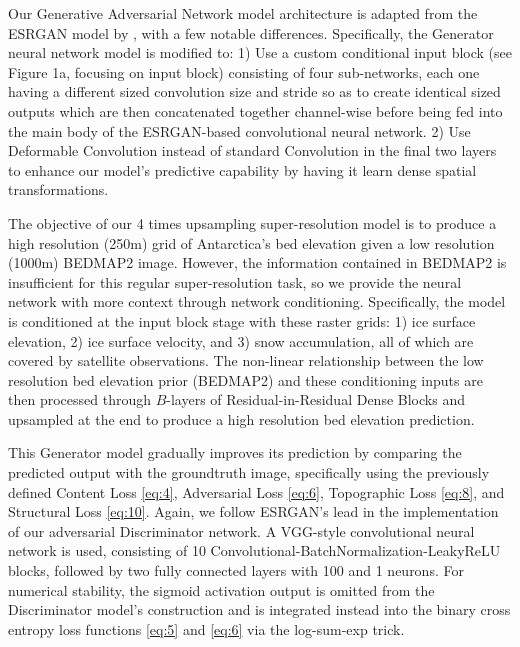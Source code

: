 \documentclass[tc, manuscript]{copernicus}
\begin{document}
Our Generative Adversarial Network model architecture is adapted from the ESRGAN model by \citet{WangESRGANEnhancedSuperResolution2018}, with a few notable differences.
Specifically, the Generator neural network model is modified to:
1) Use a custom conditional input block (see Figure 1a, focusing on input block) consisting of four sub-networks, each one having a different sized convolution size and stride so as to create identical sized outputs which are then concatenated together channel-wise before being fed into the main body of the ESRGAN-based convolutional neural network.
2) Use Deformable Convolution \citep{DaiDeformableConvolutionalNetworks2017} instead of standard Convolution in the final two layers to enhance our model's predictive capability by having it learn dense spatial transformations.

The objective of our 4 times upsampling super-resolution model is to produce a high resolution (250m) grid of Antarctica's bed elevation given a low resolution (1000m) BEDMAP2 \citep{FretwellBedmap2improvedice2013} image.
However, the information contained in BEDMAP2 is insufficient for this regular super-resolution task, so we provide the neural network with more context through network conditioning.
Specifically, the model is conditioned at the input block stage with these raster grids: 1) ice surface elevation, 2) ice surface velocity, and 3) snow accumulation, all of which are covered by satellite observations.
The non-linear relationship between the low resolution bed elevation prior (BEDMAP2) and these conditioning inputs are then processed through $B$-layers of Residual-in-Residual Dense Blocks and upsampled at the end to produce a high resolution bed elevation prediction.

This Generator model gradually improves its prediction by comparing the predicted output with the groundtruth image, specifically using the previously defined Content Loss \eqref{eq:4}, Adversarial Loss \eqref{eq:6}, Topographic Loss \eqref{eq:8}, and Structural Loss \eqref{eq:10}.
Again, we follow ESRGAN's lead in the implementation of our adversarial Discriminator network.
A VGG-style convolutional neural network \citep{SimonyanVeryDeepConvolutional2014} is used, consisting of 10 Convolutional-BatchNormalization-LeakyReLU blocks, followed by two fully connected layers with 100 and 1 neurons.
For numerical stability, the sigmoid activation output is omitted from the Discriminator model's construction and is integrated instead into the binary cross entropy loss functions \eqref{eq:5} and \eqref{eq:6} via the log-sum-exp trick.
\end{document}
